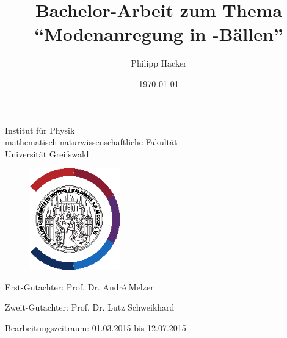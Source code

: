 \documentclass[numbers=noenddot,a4paper]{scrartcl}
\title{Bachelor-Arbeit zum Thema \enquote{Modenanregung in \tilt{Yukawa}-Bällen}} %
\author{Philipp Hacker} %
\date{\today}
\begin{document}
	
	\maketitle
	
	\begin{center}
		
		Institut für Physik\\
		mathematisch-naturwissenschaftliche Fakultät\\
		Universität Greifswald
		
	\end{center}
	 
	\vspace{0.5cm}
	
	\begin{figure}[H]
			\centering
			\includegraphics[width=0.35\textwidth]{figs/unilogo_NEU_schwarz.eps}
	\end{figure}
	
	\vspace{0.5cm}
	
	\begin{center}
			
			\hspace{-0.55cm} Erst-Gutachter: Prof. Dr. André Melzer \\ \vspace{0.25cm} %
			
			Zweit-Gutachter: Prof. Dr. Lutz Schweikhard \\ \vspace{0.25cm} %
			
			Bearbeitungszeitraum: 01.03.2015 bis 12.07.2015 \\ \vspace{0.25cm} %
		
%			
%			

	\end{center}
	
\end{document}
